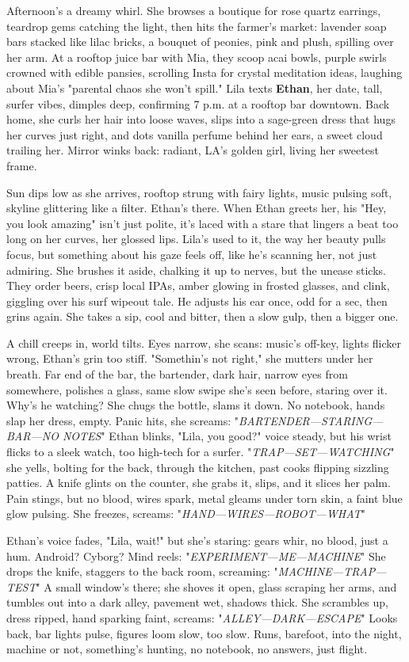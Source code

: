 \documentclass{article}
\begin{document}
Afternoon's a dreamy whirl. She browses a boutique for rose quartz earrings, teardrop gems catching the light, then hits the farmer's market: lavender soap bars stacked like lilac bricks, a bouquet of peonies, pink and plush, spilling over her arm. At a rooftop juice bar with Mia, they scoop acai bowls, purple swirls crowned with edible pansies, scrolling Insta for crystal meditation ideas, laughing about Mia's "parental chaos she won't spill." Lila texts \textbf{Ethan}, her date, tall, surfer vibes, dimples deep, confirming 7 p.m. at a rooftop bar downtown. Back home, she curls her hair into loose waves, slips into a sage-green dress that hugs her curves just right, and dots vanilla perfume behind her ears, a sweet cloud trailing her. Mirror winks back: radiant, LA's golden girl, living her sweetest frame.

Sun dips low as she arrives, rooftop strung with fairy lights, music pulsing soft, skyline glittering like a filter. Ethan's there. When Ethan greets her, his "Hey, you look amazing" isn't just polite, it's laced with a stare that lingers a beat too long on her curves, her glossed lips. Lila's used to it, the way her beauty pulls focus, but something about his gaze feels off, like he's scanning her, not just admiring. She brushes it aside, chalking it up to nerves, but the unease sticks. They order beers, crisp local IPAs, amber glowing in frosted glasses, and clink, giggling over his surf wipeout tale. He adjusts his ear once, odd for a sec, then grins again. She takes a sip, cool and bitter, then a slow gulp, then a bigger one.

A chill creeps in, world tilts. Eyes narrow, she scans: music's off-key, lights flicker wrong, Ethan's grin too stiff. "Somethin's not right," she mutters under her breath. Far end of the bar, the bartender, dark hair, narrow eyes from somewhere, polishes a glass, same slow swipe she's seen before, staring over it. Why's he watching? She chugs the bottle, slams it down. No notebook, hands slap her dress, empty. Panic hits, she screams: "\textit{BARTENDER—STARING—BAR—NO NOTES}" Ethan blinks, "Lila, you good?" voice steady, but his wrist flicks to a sleek watch, too high-tech for a surfer. "\textit{TRAP—SET—WATCHING}" she yells, bolting for the back, through the kitchen, past cooks flipping sizzling patties. A knife glints on the counter, she grabs it, slips, and it slices her palm. Pain stings, but no blood, wires spark, metal gleams under torn skin, a faint blue glow pulsing. She freezes, screams: "\textit{HAND—WIRES—ROBOT—WHAT}"

Ethan's voice fades, "Lila, wait!" but she's staring: gears whir, no blood, just a hum. Android? Cyborg? Mind reels: "\textit{EXPERIMENT—ME—MACHINE}" She drops the knife, staggers to the back room, screaming: "\textit{MACHINE—TRAP—TEST}" A small window's there; she shoves it open, glass scraping her arms, and tumbles out into a dark alley, pavement wet, shadows thick. She scrambles up, dress ripped, hand sparking faint, screams: "\textit{ALLEY—DARK—ESCAPE}" Looks back, bar lights pulse, figures loom slow, too slow. Runs, barefoot, into the night, machine or not, something's hunting, no notebook, no answers, just flight.
\end{document}
